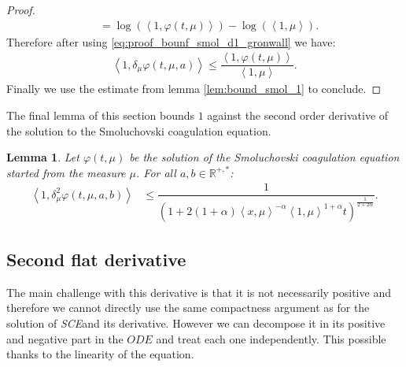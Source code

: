 \documentclass[11pt,a4paper]{article}
\newcommand{\RR}{\mathbb{R}}
\newcommand{\SCE}{{\emph{SCE}}}
\newtheorem{lemma}[theorem]{Lemma}
\begin{document}
\begin{proof}
\begin{align*}
        &= \log\left(\left\langle 1, \varphi\left(t,\mu\right)\right\rangle \right) - \log\left( \left\langle 1, \mu\right\rangle\right) .
    \end{align*}
    Therefore after using \eqref{eq:proof_bounf_smol_d1_gronwall} we have:
    \begin{align*}
        \left\langle 1, \delta_\mu\varphi\left(t,\mu,a\right)\right\rangle \leq \dfrac{\left\langle 1, \varphi\left(t,\mu\right)\right\rangle}{\left\langle 1, \mu\right\rangle}.
    \end{align*}
    Finally we use the estimate from lemma \ref{lem:bound_smol_1} to conclude.
\end{proof}

The final lemma of this section bounds $1$ against the second order derivative of the solution to the Smoluchovski coagulation equation.

\begin{lemma}
    Let $\varphi\left(t,\mu\right)$ be the solution of the Smoluchovski coagulation equation started from the measure $\mu$. For all $a,b \in \RR^{+,*}$:
    \begin{align*}
        \left\langle 1, \delta^2_\mu\varphi\left(t,\mu,a,b\right) \right\rangle &\leq \dfrac{1}{\left(1 + 2(1 + \alpha)\left\langle x, \mu \right\rangle^{-\alpha} \left\langle 1, \mu \right\rangle^{1 + \alpha} t \right)^{\frac{1}{2 + 2\alpha}}}.
    \end{align*}
\end{lemma}
\subsection{Second flat derivative}
The main challenge with this derivative is that it is not necessarily positive and therefore we cannot directly use the same compactness argument as for the solution of \SCE and its derivative. However we can decompose it in its positive and negative part in the $ODE$ and treat each one independently. This possible thanks to the linearity of the equation.
\end{document}
